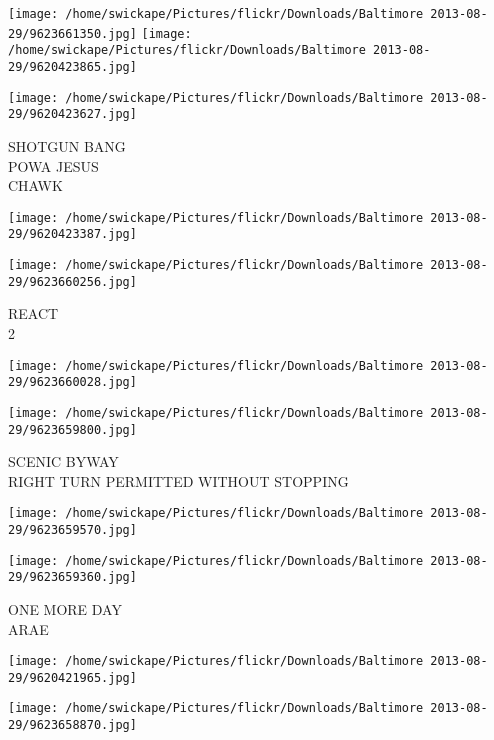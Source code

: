 \documentclass[10pt,letterpaper]{article}
\begin{document}
\texttt{[image: /home/swickape/Pictures/flickr/Downloads/Baltimore 2013-08-29/9623661350.jpg]}
\texttt{[image: /home/swickape/Pictures/flickr/Downloads/Baltimore 2013-08-29/9620423865.jpg]}

\vspace{0.25in}
\texttt{[image: /home/swickape/Pictures/flickr/Downloads/Baltimore 2013-08-29/9620423627.jpg]}

SHOTGUN BANG\\
POWA JESUS\\
CHAWK\\
\pagebreak

\texttt{[image: /home/swickape/Pictures/flickr/Downloads/Baltimore 2013-08-29/9620423387.jpg]}

\vspace{0.25in}
\texttt{[image: /home/swickape/Pictures/flickr/Downloads/Baltimore 2013-08-29/9623660256.jpg]}

REACT\\
2\\
\pagebreak

\texttt{[image: /home/swickape/Pictures/flickr/Downloads/Baltimore 2013-08-29/9623660028.jpg]}

\vspace{0.25in}
\texttt{[image: /home/swickape/Pictures/flickr/Downloads/Baltimore 2013-08-29/9623659800.jpg]}

SCENIC BYWAY\\
RIGHT TURN PERMITTED WITHOUT STOPPING\\
\pagebreak

\texttt{[image: /home/swickape/Pictures/flickr/Downloads/Baltimore 2013-08-29/9623659570.jpg]}

\vspace{0.25in}
\texttt{[image: /home/swickape/Pictures/flickr/Downloads/Baltimore 2013-08-29/9623659360.jpg]}

ONE MORE DAY\\
ARAE\\
\pagebreak

\texttt{[image: /home/swickape/Pictures/flickr/Downloads/Baltimore 2013-08-29/9620421965.jpg]}

\vspace{0.25in}
\texttt{[image: /home/swickape/Pictures/flickr/Downloads/Baltimore 2013-08-29/9623658870.jpg]}
\end{document}
